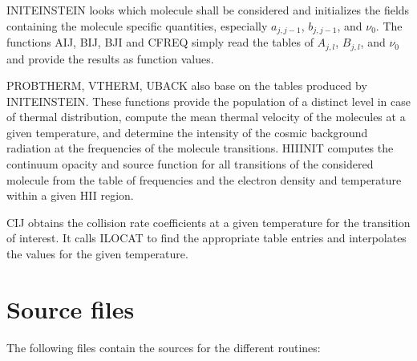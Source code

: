 INITEINSTEIN looks which molecule shall be considered and initializes 
the fields containing the molecule specific quantities, especially
$a_{j,j-1}$, $b_{j,j-1}$, and $\nu_0$. The functions AIJ, BIJ, BJI
and CFREQ simply read the tables of $A_{j,l}$, $B_{j,l}$, and $\nu_0$
and provide the results as function values.

PROBTHERM, VTHERM, UBACK also base on the tables produced by
INITEINSTEIN. These functions provide the population of a distinct 
level in case of thermal distribution, compute the mean thermal velocity
of the molecules at a given temperature, and determine the intensity
of the cosmic background radiation at the frequencies of the
molecule transitions. HIIINIT computes the continuum opacity and
source function for all transitions of the considered molecule
from the table of frequencies and the electron density and temperature 
within a given HII region.

CIJ obtains the collision rate coefficients at a given temperature 
for the transition of interest. It calls
ILOCAT to find the appropriate table entries and interpolates 
the values for the given temperature. 

\section{Source files}

The following files contain the sources for the different routines:

